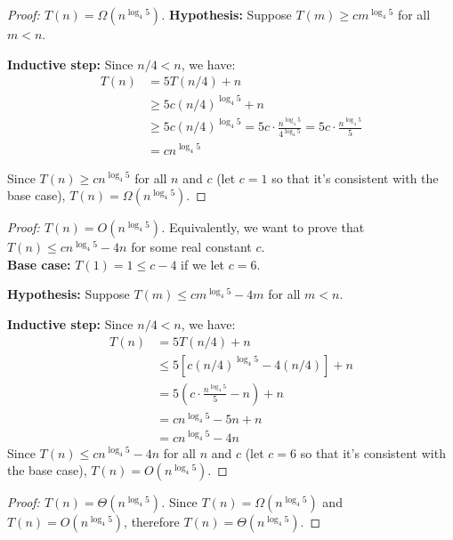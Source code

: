\documentclass{article}
\begin{document}
\begin{itemize}
\begin{mdframed}
\begin{proof}[Proof: $T(n) = \Omega(n^{\log_4 5})$]
	{\bf Hypothesis:} Suppose $T(m) \geq cm^{\log_4 5}$ for all $m<n$.
	
	{\bf Inductive step:}
	Since $n/4<n$, we have:
	\begin{align*}
	T(n) &= 5T(n/4) + n \\
	& \geq 5c(n/4)^{\log_4 5} + n \\
	& \geq 5c(n/4)^{\log_4 5} = 5c \cdot \frac{n^{\log_4 5}}{4^{\log_4 5}} = 5c \cdot \frac{n^{\log_4 5}}{5} \\
	& = cn^{\log_4 5}
	\end{align*}
	
	Since $T(n) \geq cn^{\log_4 5}$ for all $n$ and  $c$ (let $c=1$ so that it's consistent with the base case), $T(n) = \Omega(n^{\log_4 5})$.
	\end{proof}
	
	\begin{proof}[Proof: $T(n)=O(n^{\log_4 5})$]
	Equivalently, we want to prove that $T(n) \leq cn^{\log_4 5} - 4n$ for some real constant $c$. \\
	{\bf Base case:} $T(1) = 1 \leq c-4$ if we let $c=6$.
	
	{\bf Hypothesis:} Suppose $T(m) \leq cm^{\log_4 5}-4m$ for all $m<n$.
	
	{\bf Inductive step:}
	Since $n/4 < n$, we have:
	\begin{align*}
	T(n)&=5T(n/4)+n \\
	&\leq 5[c(n/4)^{\log_4 5}-4(n/4)]+n \\
	&=5(c\cdot \frac{n^{\log_4 5}}{5}-n)+n \\
	&=cn^{\log_4 5}-5n+n \\
	&=cn^{\log_4 5}-4n
	\end{align*}
	Since $T(n)\leq cn^{\log_4 5}-4n$ for all $n$ and $c$ (let $c=6$ so that it's consistent with the base case), $T(n)=O(n^{\log_4 5}) $.
	\end{proof}
	\begin{proof}[Proof: $T(n)=\Theta(n^{\log_4 5})$]
	Since $T(n)=\Omega(n^{\log_4 5})$ and $T(n)=O(n^{\log_4 5})$, therefore $T(n)=\Theta(n^{\log_4 5})$.
	\end{proof}
	\end{mdframed}


\end{itemize}
\end{document}
